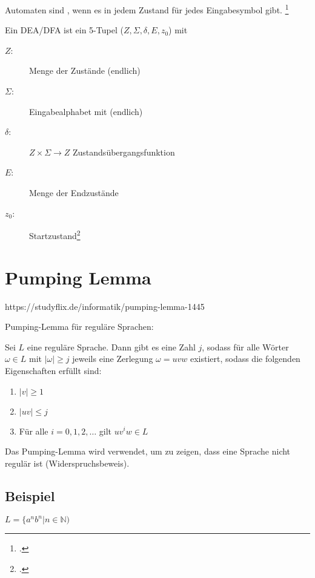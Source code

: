 \documentclass{lehramt-informatik-haupt}
\begin{document}
Automaten sind , wenn es in jedem Zustand für jedes
Eingabesymbol  gibt.
\footcite[Seite 28]{vossen}

Ein DEA/DFA ist ein 5-Tupel ($Z, \Sigma, \delta, E, z_0$) mit

\begin{description}
\item[$Z$:] Menge der Zustände (endlich)
\item[$\Sigma$:] Eingabealphabet mit (endlich)
\item[$\delta$:] $Z \times \Sigma \rightarrow Z$ Zustandsübergangsfunktion
\item[$E$:] Menge der Endzustände
\item[$z_0$:] Startzustand\footcite[Seite 26]{theo:fs:1}
\end{description}

%

\section{Pumping Lemma}

https://studyflix.de/informatik/pumping-lemma-1445

Pumping-Lemma für reguläre Sprachen:

Sei $L$ eine reguläre Sprache. Dann gibt es eine Zahl $j$, sodass für
alle Wörter $ω ∈ L$ mit $|\omega| \geq j$ jeweils eine Zerlegung $\omega
= uvw$ existiert, sodass die folgenden Eigenschaften erfüllt sind:

\begin{enumerate}
\item $|v| \geq 1$
\item $|uv| \leq j$
\item Für alle $i = 0, 1, 2, \dots$ gilt $uv^iw \in L$
\end{enumerate}

Das Pumping-Lemma wird verwendet, um zu zeigen, dass eine
Sprache nicht regulär ist (Widerspruchsbeweis).

%

\subsection{Beispiel}

$L = \{a^n b^n | n \in \mathbb{N})$
\end{document}
